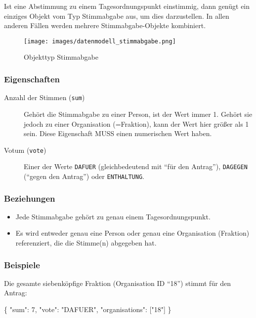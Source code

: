 \documentclass[,a4paper]{article}
\makeatletter
\newenvironment{Shaded}{}{}
\newcommand{\DataTypeTok}[1]{\textcolor[rgb]{0.56,0.13,0.00}{{#1}}}
\newcommand{\DecValTok}[1]{\textcolor[rgb]{0.25,0.63,0.44}{{#1}}}
\newcommand{\StringTok}[1]{\textcolor[rgb]{0.25,0.44,0.63}{{#1}}}
\newcommand{\NormalTok}[1]{{#1}}
\def\maxwidth{\ifdim\Gin@nat@width>\linewidth\linewidth
\else\Gin@nat@width\fi}
\let\Oldincludegraphics\includegraphics
\renewcommand{\includegraphics}[1]{\Oldincludegraphics[width=\maxwidth]{#1}}
\makeatother
\begin{document}
Ist eine Abstimmung zu einem Tagesordnungspunkt einstimmig, dann genügt
ein einziges Objekt vom Typ Stimmabgabe aus, um dies darzustellen. In
allen anderen Fällen werden mehrere Stimmabgabe-Objekte kombiniert.

\begin{figure}[htbp]
\centering
\texttt{[image: images/datenmodell\_stimmabgabe.png]}
\caption{Objekttyp Stimmabgabe}
\end{figure}

\subsubsection{Eigenschaften}

\begin{description}
\item[Anzahl der Stimmen (\texttt{sum})]
Gehört die Stimmabgabe zu einer Person, ist der Wert immer 1. Gehört sie
jedoch zu einer Organisation (=Fraktion), kann der Wert hier größer als
1 sein. Diese Eigenschaft MUSS einen numerischen Wert haben.
\item[Votum (\texttt{vote})]
Einer der Werte \texttt{DAFUER} (gleichbedeutend mit ``für den
Antrag''), \texttt{DAGEGEN} (``gegen den Antrag'') oder
\texttt{ENTHALTUNG}.
\end{description}

\subsubsection{Beziehungen}

\begin{itemize}
\item
  Jede Stimmabgabe gehört zu genau einem Tagesordnungspunkt.
\item
  Es wird entweder genau eine Person oder genau eine Organisation
  (Fraktion) referenziert, die die Stimme(n) abgegeben hat.
\end{itemize}

\subsubsection{Beispiele}

Die gesamte siebenköpfige Fraktion (Organisation ID ``18'') stimmt für
den Antrag:

\begin{Shaded}
\begin{Highlighting}[]
\NormalTok{\{}
    \DataTypeTok{"sum"}\NormalTok{: }\DecValTok{7}\NormalTok{,}
    \DataTypeTok{"vote"}\NormalTok{: }\StringTok{"DAFUER"}\NormalTok{,}
    \DataTypeTok{"organisations"}\NormalTok{: [}\StringTok{"18"}\NormalTok{]}
\NormalTok{\}}
\end{Highlighting}
\end{Shaded}
\end{document}
